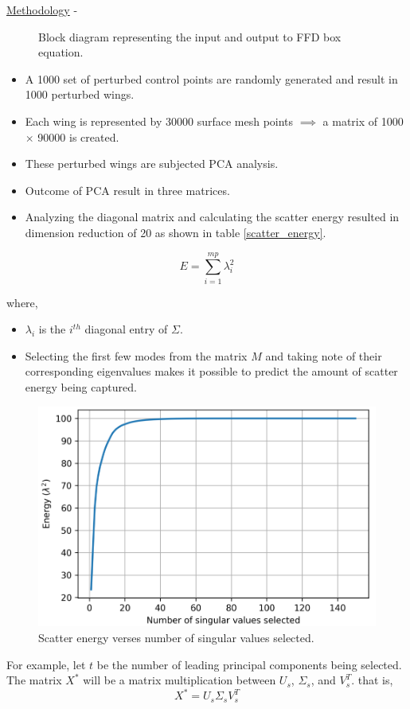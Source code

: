 \begin{frame}[allowframebreaks]{\underline{Methodology} -}
{\begin{figure}
    \caption{Block diagram representing the input and output to FFD box equation.}
\end{figure}
}
\begin{itemize}
\item A 1000 set of perturbed control points are randomly generated and result in 1000 perturbed wings. 
\item Each wing is represented by 30000 surface mesh points $\implies$ a matrix of 1000 $\times$ 90000 is created.
\item These perturbed wings are subjected PCA analysis.
\item Outcome of PCA result in three matrices. 
\item Analyzing the diagonal matrix and calculating the scatter energy resulted in dimension reduction of 20 as shown in table \ref{scatter_energy}.
\end{itemize}


$$E=\sum_{i=1}^{m p} \lambda_{i}^{2}$$

where,\\
\begin{itemize}
\item $\lambda_i$ is the $i^{th}$ diagonal entry of $\Sigma$. 
\item Selecting the first few modes from the matrix $M$ and taking note of their corresponding eigenvalues makes it possible to predict the amount of scatter energy being captured.
\end{itemize}

\parbox{0.43\linewidth}{
\begin{figure}   
    \centering
    \includegraphics[scale=0.13]{figures/energy_plot.png}
    \caption{Scatter energy verses number of singular values selected.}
    \label{energy plot}
\end{figure}
}
\parbox{0.46\linewidth}{

}
\newpage
For example, let $t$ be the number of leading principal components being selected. The matrix $X^*$ will be a matrix multiplication between $U_s$, $\Sigma_s$, and $V^T_s$. that is, $$X^* = U_s \Sigma_s V^T_s$$


\end{frame}
